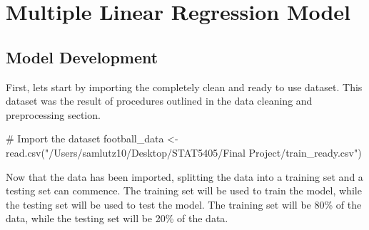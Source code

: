 \documentclass[
  super,
  preprint,
  3p]{elsarticle}
\newenvironment{Shaded}{\begin{snugshade}}{\end{snugshade}}
\newcommand{\CommentTok}[1]{\textcolor[rgb]{0.37,0.37,0.37}{#1}}
\newcommand{\ControlFlowTok}[1]{\textcolor[rgb]{0.00,0.23,0.31}{#1}}
\newcommand{\DecValTok}[1]{\textcolor[rgb]{0.68,0.00,0.00}{#1}}
\newcommand{\FloatTok}[1]{\textcolor[rgb]{0.68,0.00,0.00}{#1}}
\newcommand{\FunctionTok}[1]{\textcolor[rgb]{0.28,0.35,0.67}{#1}}
\newcommand{\NormalTok}[1]{\textcolor[rgb]{0.00,0.23,0.31}{#1}}
\newcommand{\OtherTok}[1]{\textcolor[rgb]{0.00,0.23,0.31}{#1}}
\newcommand{\SpecialCharTok}[1]{\textcolor[rgb]{0.37,0.37,0.37}{#1}}
\newcommand{\StringTok}[1]{\textcolor[rgb]{0.13,0.47,0.30}{#1}}
\begin{document}
\hypertarget{multiple-linear-regression-model}{%
\section{Multiple Linear Regression
Model}\label{multiple-linear-regression-model}}

\hypertarget{model-development}{%
\subsection{Model Development}\label{model-development}}

First, lets start by importing the completely clean and ready to use
dataset. This dataset was the result of procedures outlined in the data
cleaning and preprocessing section.

\begin{Shaded}
\begin{Highlighting}[]
\CommentTok{\# Import the dataset}
\NormalTok{football\_data }\OtherTok{\textless{}{-}} \FunctionTok{read.csv}\NormalTok{(}\StringTok{"/Users/samlutz10/Desktop/STAT5405/Final Project/train\_ready.csv"}\NormalTok{)}
\end{Highlighting}
\end{Shaded}

Now that the data has been imported, splitting the data into a training
set and a testing set can commence. The training set will be used to
train the model, while the testing set will be used to test the model.
The training set will be 80\% of the data, while the testing set will be
20\% of the data.

\begin{Shaded}
\end{Shaded}
\end{document}
